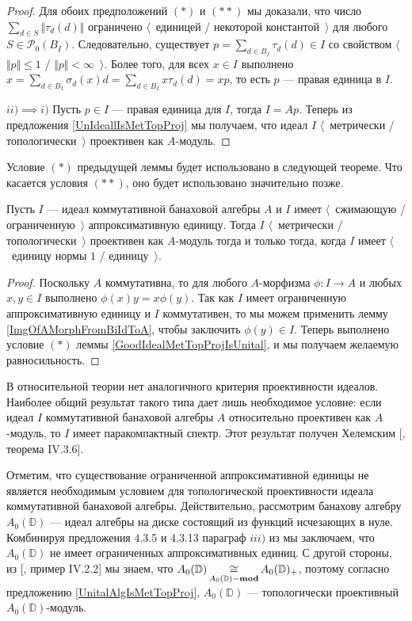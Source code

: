 \begin{proof}
Для обоих предположений $(*)$ и $(**)$ мы доказали, что число $\sum_{d\in S}\Vert \tau_d(d)\Vert$ ограничено $\langle$~единицей / некоторой константой~$\rangle$ для любого $S\in \mathcal{P}_0(B_I)$. Следовательно, существует $p=\sum_{d\in B_I}\tau_d(d)\in I$ со свойством $\langle$~$\Vert p\Vert\leq 1$ / $\Vert p\Vert< \infty$~$\rangle$. Более того, для всех $x\in I$ выполнено $x=\sum_{d\in B_I}\sigma_d(x)d=\sum_{d\in B_I}x\tau_d(d)=xp$, то есть $p$ --- правая единица в $I$. 

$ii)$$\implies$$i)$ Пусть $p\in I$  --- правая единица для $I$, тогда $I=Ap$. Теперь из предложения \ref{UnIdeallIsMetTopProj} мы получаем, что идеал $I$ $\langle$~метрически / топологически~$\rangle$ проективен как $A$-модуль.
\end{proof}

Условие $(*)$ предыдущей леммы будет использовано в следующей теореме. Что касается условия $(**)$, оно будет использовано значительно позже.

\begin{theorem}\label{GoodCommIdealMetTopProjIsUnital} Пусть $I$ --- идеал коммутативной банаховой алгебры $A$ и $I$ имеет $\langle$~сжимающую / ограниченную~$\rangle$ аппроксимативную единицу. Тогда $I$ $\langle$~метрически / топологически~$\rangle$ проективен как $A$-модуль тогда и только тогда, когда $I$ имеет $\langle$~единицу нормы $1$ / единицу~$\rangle$.
\end{theorem} 
\begin{proof} Поскольку $A$ коммутативна, то для любого $A$-морфизма $\phi:I\to A$ и любых $x,y\in I$ выполнено $\phi(x)y=x\phi(y)$. Так как $I$ имеет ограниченную аппроксимативную единицу и $I$ коммутативен, то мы можем применить лемму \ref{ImgOfAMorphFromBiIdToA}, чтобы заключить $\phi(y)\in I$. Теперь выполнено условие $(*)$ леммы \ref{GoodIdealMetTopProjIsUnital}, и мы получаем желаемую равносильность.
\end{proof}

В относительной теории нет аналогичного критерия проективности идеалов. Наиболее общий результат такого типа дает лишь необходимое условие: если идеал $I$ коммутативной банаховой алгебры $A$ относительно проективен как $A$-модуль, то $I$ имеет паракомпактный спектр. Этот результат получен Хелемским [\cite{HelHomolBanTopAlg}, теорема IV.3.6]. 

Отметим, что существование ограниченной аппроксимативной единицы не является необходимым условием для топологической проективности идеала коммутативной банаховой алгебры. Действительно, рассмотрим банахову алгебру  $A_0(\mathbb{D})$ --- идеал алгебры на диске состоящий из функций исчезающих в нуле. Комбинируя предложения 4.3.5 и 4.3.13 параграф $iii)$ из \cite{DalBanAlgAutCont} мы заключаем, что $A_0(\mathbb{D})$ не имеет ограниченных аппроксимативных единиц. С другой стороны, из [\cite{HelBanLocConvAlg}, пример IV.2.2] мы знаем, что $A_0(\mathbb{D})\mathop{\mathbin{\cong}}\limits_{A_0(\mathbb{D})-\mathbf{mod}} A_0(\mathbb{D})_+$, поэтому согласно предложению \ref{UnitalAlgIsMetTopProj}, $A_0(\mathbb{D})$ --- топологически проективный $A_0(\mathbb{D})$-модуль.

